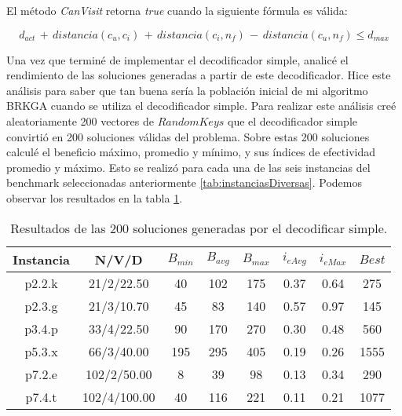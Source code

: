 \bigskip

\begin{mycapequ}[!ht]
	\caption{El método \textit{CanVisit} retorna \textit{true} cuando la siguiente fórmula es válida:}
	\begin{equation} \label{eq:canVisit}
	d_{act}\, +\, distancia(c_u, c_i)\, +\, distancia(c_i, n_f)\, -\, distancia(c_u, n_f) \leq d_{max}
	\end{equation}
\end{mycapequ}

\bigskip

Una vez que terminé de implementar el decodificador simple, analicé el rendimiento de las soluciones generadas a partir de este decodificador. Hice este análisis para saber que tan buena sería la población inicial de mi algoritmo BRKGA cuando se utiliza el decodificador simple. Para realizar este análisis creé aleatoriamente 200 vectores de $RandomKeys$ que el decodificador simple convirtió en 200 soluciones válidas del problema. Sobre estas 200 soluciones calculé el beneficio máximo, promedio y mínimo, y sus índices de efectividad promedio y máximo. Esto se realizó para cada una de las seis instancias del benchmark seleccionadas anteriormente \ref{tab:instanciasDiversas}. Podemos observar los resultados en la tabla \ref{tab:resultadosDecoSimple}.

\bigskip

\begin{table}
\begin{center}
\begin{tabular}{ |c|c|c|c|c|c|c|c| } 
\hline
Instancia & N/V/D & $B_{min}$ & $B_{avg}$ & $B_{max}$ & $i_{eAvg}$ & $i_{eMax}$ & $Best$ \\
\hline
p2.2.k & 21/2/22.50 & 40 & 102 & 175 & 0.37 & 0.64 & 275 \\
p2.3.g & 21/3/10.70 & 45 & 83 & 140 & 0.57 & 0.97 & 145 \\
p3.4.p & 33/4/22.50 & 90 & 170 & 270 & 0.30 & 0.48 & 560 \\
p5.3.x & 66/3/40.00 & 195 & 295 & 405 & 0.19 & 0.26 & 1555 \\
p7.2.e & 102/2/50.00 & 8 & 39 & 98 & 0.13 & 0.34 & 290 \\
p7.4.t & 102/4/100.00 & 40 & 116 & 221 & 0.11 & 0.21 & 1077 \\
\hline
\end{tabular}
\end{center}
\caption{Resultados de las 200 soluciones generadas por el decodificar simple.}
\label{tab:resultadosDecoSimple}
\end{table}

